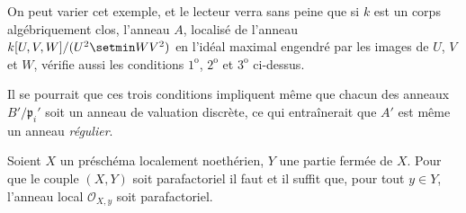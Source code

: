 \begin{examples}[21.13.9]
On peut varier cet exemple, et le lecteur verra sans peine que si $k$ est un corps
algébriquement clos, l'anneau $A$, localisé de l'anneau
$k[U,V,W]/(U^2\setmin WV^2)$ en l'idéal maximal engendré par les images de $U$, $V$ et $W$,
vérifie aussi les conditions $1^{\mathrm o}$, $2^{\mathrm o}$ et $3^{\mathrm o}$
ci-dessus.

Il se pourrait que ces trois conditions impliquent même que chacun des anneaux
$B'/\mathfrak p_i'$ soit un anneau de valuation discrète, ce qui entraînerait que
$A'$ est même un anneau \emph{régulier}.
\end{examples}

\begin{proposition}[21.13.10]
\label{IV.21.13.10}
Soient $X$ un préschéma localement noethérien, $Y$ une partie fermée de $X$. Pour que
le couple $(X,Y)$ soit parafactoriel il faut et il suffit que, pour tout $y\in Y$,
l'anneau local $\mathcal O_{X,y}$ soit parafactoriel.
\end{proposition}

